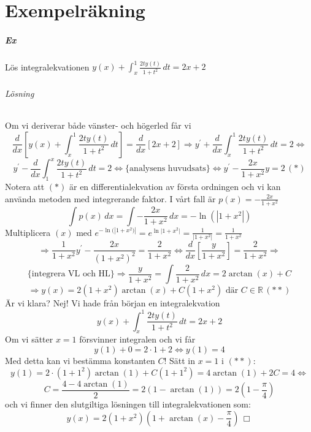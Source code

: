 \chapter{Exempelräkning}
\paragraph{Ex} Lös integralekvationen $y(x)+\int_x^1\frac{2ty(t)}{1+t^2}\, dt=2x+2$
\subparagraph*{Lösning}
Om vi deriverar både vänster- och högerled får vi
\begin{equation*}
    \frac{d}{dx}[y(x)+\int_x^1\frac{2ty(t)}{1+t^2}\, dt]=
    \frac{d}{dx}[2x+2]\Rightarrow
    y^\prime+\frac{d}{dx}\int_x^1\frac{2ty(t)}{1+t^2}\, dt=2\Leftrightarrow
\end{equation*}
\begin{equation*}
    y^\prime-\frac{d}{dx}\int_1^x\frac{2ty(t)}{1+t^2}\, dt=2\Leftrightarrow
    \{\text{analysens huvudsats}\}\Leftrightarrow
    y^\prime-\frac{2x}{1+x^2}y=2\, (*)
\end{equation*}
Notera att $(*)$ är en differentialekvation av första ordningen och vi kan använda metoden med integrerande faktor.
I vårt fall är $p(x)=-\frac{2x}{1+x^2}$
\begin{equation*}
    \int p(x)\, dx=\int-\frac{2x}{1+x^2}\, dx=-\ln(|1+x^2|)
\end{equation*}
Multiplicera $(x)$ med $e^{-\ln(|1+x^2)|}=e^{\ln{|1+x^2}|}=\frac{1}{|1+x^2|}=\frac{1}{1+x^2}$
\begin{equation*}
    \Rightarrow \frac{1}{1+x^2}y^\prime-\frac{2x}{(1+x^2)^2}=\frac{2}{1+x^2}\Leftrightarrow
    \frac{d}{dx}[\frac{y}{1+x^2}]=\frac{2}{1+x^2}\Rightarrow
\end{equation*}
\begin{equation*}
    \{\text{integrera VL och HL}\}\Rightarrow
    \frac{y}{1+x^2}=
    \int\frac{2}{1+x^2}\, dx=
    2\arctan(x)+C
\end{equation*}
\begin{equation*}
    \Rightarrow y(x)=
    2(1+x^2)\arctan(x)+C(1+x^2)\text{ där }C\in\mathbb{R}\, (**)
\end{equation*}
Är vi klara? Nej! Vi hade från början en integralekvation
\begin{equation*}
    y(x)+\int_x^1\frac{2ty(t)}{1+t^2}\, dt=2x+2
\end{equation*}
Om vi sätter $x=1$ försvinner integralen och vi får
\begin{equation*}
    y(1)+0=2\cdot 1+2\Leftrightarrow
    y(1)=4
\end{equation*}
Med detta kan vi bestämma konstanten $C$!
Sätt in $x=1$ i $(**)$:
\begin{equation*}
    y(1)=
    2\cdot(1+1^2)\arctan(1)+C(1+1^2)=
    4\arctan(1)+2C=4\Leftrightarrow
\end{equation*}
\begin{equation*}
    C=\frac{4-4\arctan(1)}{2}=
    2(1-\arctan(1))=
    2(1-\frac{\pi}{4})
\end{equation*}
och vi finner den slutgiltiga lösningen till integralekvationen som:
\begin{equation*}
    y(x)=2(1+x^2)(1+\arctan(x)-\frac{\pi}{4})\, \Box
\end{equation*}

